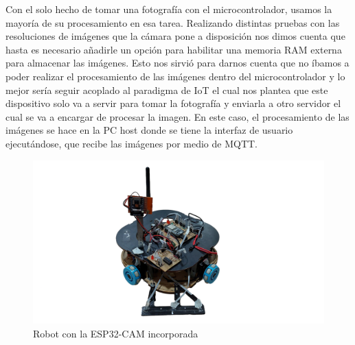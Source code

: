 Con el solo hecho de tomar una fotografía con el microcontrolador, usamos la mayoría de su procesamiento en esa tarea. Realizando distintas pruebas con las resoluciones de imágenes que la cámara pone a disposición nos dimos cuenta que hasta es necesario añadirle un opción para habilitar una memoria RAM externa para almacenar las imágenes. Esto nos sirvió para darnos cuenta que no íbamos a poder realizar el procesamiento de las imágenes dentro del microcontrolador y lo mejor sería seguir acoplado al paradigma de IoT el cual nos plantea que este dispositivo solo va a servir para tomar la fotografía y enviarla a otro servidor el cual se va a encargar de procesar la imagen. En este caso, el procesamiento de las imágenes se hace en la PC host donde se tiene la interfaz de usuario ejecutándose, que recibe las imágenes por medio de MQTT.

\begin{figure}[H]
   \centering
   \includegraphics[width=1.0\linewidth]{images/robot_camara.png}
   \caption{Robot con la ESP32-CAM incorporada}
   \label{fig:robot_camara}
\end{figure}
